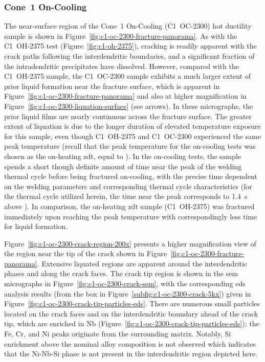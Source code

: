 {\subsubsection{Cone~1 On-Cooling}
The near-surface region of the Cone~1 On-Cooling  (C1~OC-2300) hot ductility sample is shown in Figure~\ref{fig:c1-oc-2300-fracture-panorama}. As with the C1~OH-2375 test (Figure~\ref{fig:c1-oh-2375}), cracking is readily apparent with the crack paths following the interdendritic boundaries, and a significant fraction of the intradendritic precipitates have dissolved. However, compared with the C1~OH-2375 sample, the C1~OC-2300 sample exhibits a much larger extent of prior liquid formation near the fracture surface, which is apparent in Figure~\ref{fig:c1-oc-2300-fracture-panorama} and also at higher magnification in Figure~\ref{fig:c1-oc-2300-liquation-surface} (see arrows). In these micrographs, the prior liquid films are nearly continuous across the fracture surface. The greater extent of liquation is due to the longer duration of elevated temperature exposure for this sample, even though C1~OH-2375 and C1~OC-2300 experienced the same peak temperature (recall that the peak temperature for the on-cooling tests was chosen as the on-heating \gls{zdt}, equal to ). In the on-cooling tests, the sample spends a short though definite amount of time near the peak of the welding thermal cycle before being fractured on-cooling, with the precise time dependent on the welding parameters and corresponding thermal cycle characteristics (for the thermal cycle utilized herein, the time near the peak corresponds to \SI[round-mode=places,round-precision=1]{1.4}{\second} above ). In comparison, the on-heating \gls{zdt} sample (C1~OH-2375) was fractured immediately upon reaching the peak temperature with correspondingly less time for liquid formation.

Figure~\ref{fig:c1-oc-2300-crack-region-200x} presents a higher magnification view of the region near the tip of the crack shown in Figure~\ref{fig:c1-oc-2300-fracture-panorama}. Extensive liquated regions are apparent around the interdendritic phases and along the crack faces. The crack tip region is shown in the \gls{sem} micrographs in Figure~\ref{fig:c1-oc-2300-crack-sem}, with the corresponding \gls{eds} analysis results (from the box in Figure~\ref{subfig:c1-oc-2300-crack-5kx}) given in Figure~\ref{fig:c1-oc-2300-crack-tip-particles-eds}. There are numerous small particles located on the crack faces and on the interdendritic boundary ahead of the crack tip, which are enriched in Nb (Figure~\ref{fig:c1-oc-2300-crack-tip-particles-eds}); the Fe, Cr, and Ni peaks originate from the surrounding matrix. Notably, Si enrichment above the nominal alloy composition is not observed which indicates that the Ni-Nb-Si phase is not present in the interdendritic region depicted here. 

}
